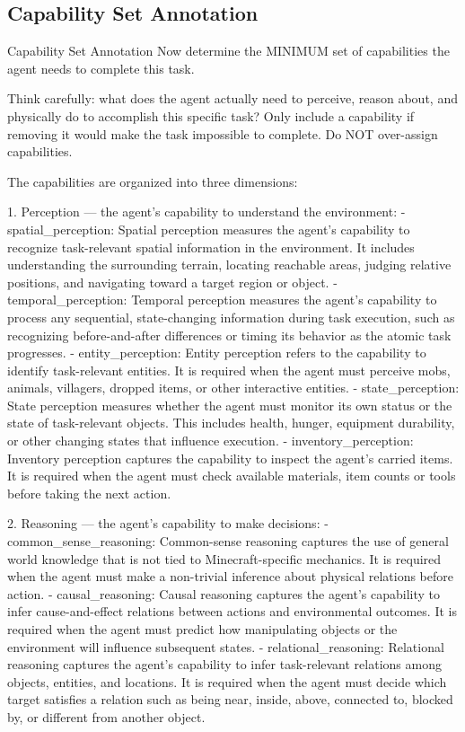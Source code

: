 \documentclass[11pt]{article}
\begin{document}
\subsection{Capability Set Annotation}
\label{appendix: Capability Set Annotation}
\begin{center}
\centering
\begin{widepromptbox}{Capability Set Annotation}
Now determine the MINIMUM set of capabilities the agent needs to complete this task.

Think carefully: what does the agent actually need to perceive, reason about, and physically do to accomplish this specific task? Only include a capability if removing it would make the task impossible to complete. Do NOT over-assign capabilities.

The capabilities are organized into three dimensions:

1. Perception — the agent's capability to understand the environment:
   - spatial_perception: Spatial perception measures the agent's capability to recognize task-relevant spatial information in the environment. It includes understanding the surrounding terrain, locating reachable areas, judging relative positions, and navigating toward a target region or object.
   - temporal_perception: Temporal perception measures the agent's capability to process any sequential, state-changing information during task execution, such as recognizing before-and-after differences or timing its behavior as the atomic task progresses.
   - entity_perception: Entity perception refers to the capability to identify task-relevant entities. It is required when the agent must perceive mobs, animals, villagers, dropped items, or other interactive entities.
   - state_perception: State perception measures whether the agent must monitor its own status or the state of task-relevant objects. This includes health, hunger, equipment durability, or other changing states that influence execution.
   - inventory_perception: Inventory perception captures the capability to inspect the agent's carried items. It is required when the agent must check available materials, item counts or tools before taking the next action.

2. Reasoning — the agent's capability to make decisions:
   - common_sense_reasoning: Common-sense reasoning captures the use of general world knowledge that is not tied to Minecraft-specific mechanics. It is required when the agent must make a non-trivial inference about physical relations before action.
   - causal_reasoning: Causal reasoning captures the agent's capability to infer cause-and-effect relations between actions and environmental outcomes. It is required when the agent must predict how manipulating objects or the environment will influence subsequent states.
   - relational_reasoning: Relational reasoning captures the agent's capability to infer task-relevant relations among objects, entities, and locations. It is required when the agent must decide which target satisfies a relation such as being near, inside, above, connected to, blocked by, or different from another object.


\end{widepromptbox}
\end{center}
\end{document}
